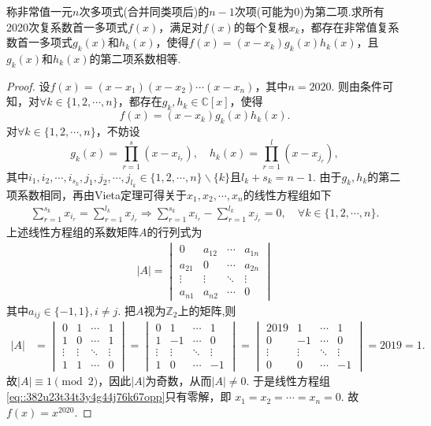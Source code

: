 \documentclass[../../main.tex]{subfiles}
\begin{document}
\begin{example}
称非常值一元$n$次多项式(合并同类项后)的$n-1$次项(可能为0)为第二项.求所有2020次复系数首一多项式$f(x)$，满足对$f(x)$的每个复根$x_k$，都存在非常值复系数首一多项式$g_k(x)$和$h_k(x)$，使得$f(x)=(x - x_k)g_k(x)h_k(x)$，且$g_k(x)$和$h_k(x)$的第二项系数相等.
\end{example}
\begin{proof}
设$f(x)=(x-x_1)(x-x_2)\cdots(x-x_n)$，其中$n=2020$. 则由条件可知，对$\forall k\in\{1,2,\cdots,n\}$，都存在$g_k,h_k\in\mathbb{C}[x]$，使得
$$f(x)=(x-x_k)g_k(x)h_k(x).$$
对$\forall k\in\{1,2,\cdots,n\}$，不妨设
$$g_k(x)=\prod_{r=1}^s(x-x_{i_r}),\quad h_k(x)=\prod_{r=1}^l(x-x_{j_r}),$$
其中$i_1,i_2,\cdots,i_{s_k},j_1,j_2,\cdots,j_{l_k}\in\{1,2,\cdots,n\}\backslash\{k\}$且$l_k+s_k=n-1$.
由于$g_k,h_k$的第二项系数相同，再由Vieta定理可得关于$x_1,x_2,\cdots,x_n$的线性方程组如下
\begin{align}
\sum_{r=1}^{s_k}x_{i_r}=\sum_{r=1}^{l_k}x_{j_r}\Longrightarrow\sum_{r=1}^{s_k}x_{i_r}-\sum_{r=1}^{l_k}x_{j_r}=0,\quad\forall k\in\{1,2,\cdots,n\}.\label{eq::382u23t34t3y4g44j76k67opp}
\end{align}
上述线性方程组的系数矩阵$A$的行列式为
\begin{align*}
|A|=\begin{vmatrix}
0&a_{12}&\cdots&a_{1n}\\
a_{21}&0&\cdots&a_{2n}\\
\vdots&\vdots&\ddots&\vdots\\
a_{n1}&a_{n2}&\cdots&0
\end{vmatrix}
\end{align*}
其中$a_{ij}\in\{-1,1\},i\ne j$. 把$A$视为$\mathbb{Z}_2$上的矩阵,则
\begin{align*}
|A|&=\begin{vmatrix}
0&1&\cdots&1\\
1&0&\cdots&1\\
\vdots&\vdots&\ddots&\vdots\\
1&1&\cdots&0
\end{vmatrix}=\begin{vmatrix}
0&1&\cdots&1\\
1&-1&\cdots&0\\
\vdots&\vdots&\ddots&\vdots\\
1&0&\cdots&-1
\end{vmatrix}=\begin{vmatrix}
2019&1&\cdots&1\\
0&-1&\cdots&0\\
\vdots&\vdots&\ddots&\vdots\\
0&0&\cdots&-1
\end{vmatrix}=2019=1.
\end{align*}
故$|A|\equiv1\pmod{2}$，因此$|A|$为奇数，从而$|A|\ne0$. 于是线性方程组\eqref{eq::382u23t34t3y4g44j76k67opp}只有零解，即
$x_1=x_2=\cdots=x_n=0$.
故$f(x)=x^{2020}$.

\end{proof}
\end{document}
